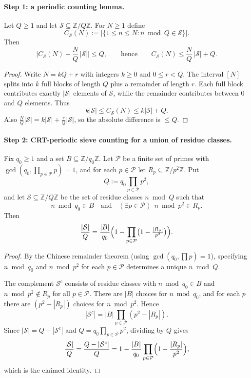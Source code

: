 \paragraph{Step 1: a periodic counting lemma.}
\begin{lemma}\label{lem:periodic-count}
Let $Q\ge 1$ and let $\mathcal S\subseteq \mathbb Z/Q\mathbb Z$.  For $N\ge 1$ define
\[
C_{\mathcal S}(N):=\bigl|\{1\le n\le N: n\bmod Q\in \mathcal S\}\bigr|.
\]
Then
\[
\bigl|C_{\mathcal S}(N)-\frac{N}{Q}\,|\mathcal S|\bigr|\le Q,
\qquad\text{hence}\qquad
C_{\mathcal S}(N)\le \frac{N}{Q}\,|\mathcal S|+Q.
\]
\end{lemma}
\begin{proof}
Write $N=kQ+r$ with integers $k\ge 0$ and $0\le r<Q$.  The interval $[N]$ splits into $k$ full blocks of length $Q$ plus a remainder of length $r$.  Each full block contributes exactly $|\mathcal S|$ elements of $\mathcal S$, while the remainder contributes between $0$ and $Q$ elements.  Thus
\[
k|\mathcal S|\le C_{\mathcal S}(N)\le k|\mathcal S|+Q.
\]
Also $\frac{N}{Q}|\mathcal S|=k|\mathcal S|+\frac{r}{Q}|\mathcal S|$, so the absolute difference is $\le Q$.
\end{proof}

\paragraph{Step 2: CRT-periodic sieve counting for a union of residue classes.}
\begin{lemma}\label{lem:crt-density}
Fix $q_0\ge 1$ and a set $B\subseteq \mathbb Z/q_0\mathbb Z$.
Let $\mathcal P$ be a finite set of primes with $\gcd(q_0,\prod_{p\in\mathcal P}p)=1$, and for each $p\in\mathcal P$ let $R_p\subseteq \mathbb Z/p^2\mathbb Z$.
Put
\[
Q:=q_0\prod_{p\in\mathcal P}p^2,
\]
and let $\mathcal S\subseteq \mathbb Z/Q\mathbb Z$ be the set of residue classes $n\bmod Q$ such that
\[
n\bmod q_0\in B
\quad\text{and}\quad
(\exists p\in\mathcal P)\ \ n\bmod p^2\in R_p.
\]
Then
\[
\frac{|\mathcal S|}{Q}=\frac{|B|}{q_0}\Bigl(1-\prod_{p\in\mathcal P}\bigl(1-\tfrac{|R_p|}{p^2}\bigr)\Bigr).
\]
\end{lemma}
\begin{proof}
By the Chinese remainder theorem (using $\gcd(q_0,\prod p)=1$), specifying $n\bmod q_0$ and $n\bmod p^2$ for each $p\in\mathcal P$ determines a unique $n\bmod Q$.

The complement $\mathcal S^c$ consists of residue classes with $n\bmod q_0\in B$ and $n\bmod p^2\notin R_p$ for all $p\in\mathcal P$.  There are $|B|$ choices for $n\bmod q_0$, and for each $p$ there are $(p^2-|R_p|)$ choices for $n\bmod p^2$.  Hence
\[
|\mathcal S^c|=|B|\prod_{p\in\mathcal P}(p^2-|R_p|).
\]
Since $|\mathcal S|=Q-|\mathcal S^c|$ and $Q=q_0\prod_{p\in\mathcal P}p^2$, dividing by $Q$ gives
\[
\frac{|\mathcal S|}{Q}
=\frac{Q-|\mathcal S^c|}{Q}
=1-\frac{|B|}{q_0}\prod_{p\in\mathcal P}\Bigl(1-\frac{|R_p|}{p^2}\Bigr),
\]
which is the claimed identity.
\end{proof}

